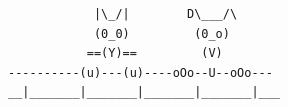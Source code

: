 \documentclass{article}
\begin{document}
\begin{enumerate}[1.]
\begin{enumerate}
    
\end{enumerate}


\end{enumerate}

\vfill
\begin{center}
\begin{BVerbatim}
            |\_/|        D\___/\
            (0_0)         (0_o)
           ==(Y)==         (V)
----------(u)---(u)----oOo--U--oOo---
__|_______|_______|_______|_______|___
\end{BVerbatim}
\end{center}
\end{document}
